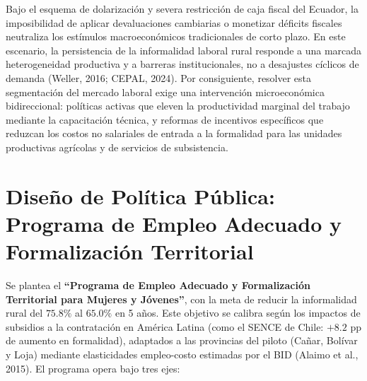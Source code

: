 \documentclass[10pt,]{article}
\begin{document}
Bajo el esquema de dolarización y severa restricción de caja fiscal del
Ecuador, la imposibilidad de aplicar devaluaciones cambiarias o
monetizar déficits fiscales neutraliza los estímulos macroeconómicos
tradicionales de corto plazo. En este escenario, la persistencia de la
informalidad laboral rural responde a una marcada heterogeneidad
productiva y a barreras institucionales, no a desajustes cíclicos de
demanda (Weller, 2016; CEPAL, 2024). Por consiguiente, resolver esta
segmentación del mercado laboral exige una intervención microeconómica
bidireccional: políticas activas que eleven la productividad marginal
del trabajo mediante la capacitación técnica, y reformas de incentivos
específicos que reduzcan los costos no salariales de entrada a la
formalidad para las unidades productivas agrícolas y de servicios de
subsistencia.

\section{Diseño de Política Pública: Programa de Empleo Adecuado y
Formalización
Territorial}\label{diseuxf1o-de-poluxedtica-puxfablica-programa-de-empleo-adecuado-y-formalizaciuxf3n-territorial}

Se plantea el \textbf{``Programa de Empleo Adecuado y Formalización
Territorial para Mujeres y Jóvenes''}, con la meta de reducir la
informalidad rural del \(75.8\%\) al \(65.0\%\) en 5 años. Este objetivo
se calibra según los impactos de subsidios a la contratación en América
Latina (como el SENCE de Chile: \(+8.2\) pp de aumento en formalidad),
adaptados a las provincias del piloto (Cañar, Bolívar y Loja) mediante
elasticidades empleo-costo estimadas por el BID (Alaimo et al., 2015).
El programa opera bajo tres ejes:
\end{document}
